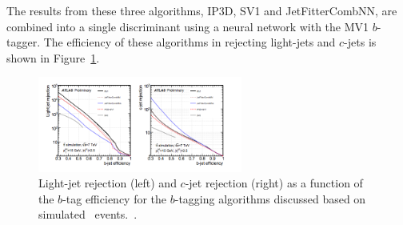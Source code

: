 The results from these three algorithms, IP3D, SV1 and JetFitterCombNN, are combined into a single discriminant using a neural network with the MV1 $b$-tagger. The efficiency of these algorithms in rejecting light-jets and $c$-jets is shown in Figure~\ref{fig:btagEff}.

\begin{figure}[h]
\centering
\includegraphics[width=0.6\textwidth]{fig/obj/btageff.png}
\caption{Light-jet rejection (left) and $c$-jet rejection (right) as a function of the $b$-tag efficiency for the
$b$-tagging algorithms discussed based on simulated \ttbar\ events.~\cite{btagptrel}.}
\label{fig:btagEff}
\end{figure}



